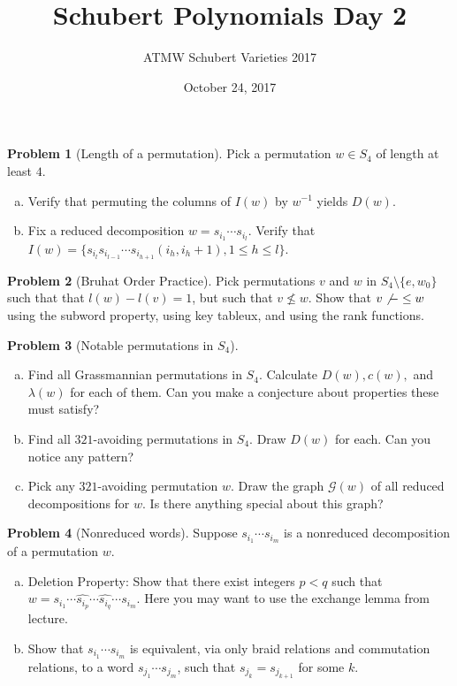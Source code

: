 \documentclass{amsart}
\newcommand{\+}[1]{\ensuremath{\mathbf{#1}}}
\theoremstyle{definition}
\newtheorem{prob}{Problem}
\begin{document}
\title{Schubert Polynomials Day 2}
\date{October 24, 2017}
\author{ATMW Schubert Varieties 2017}

\maketitle

\begin{prob}[Length of a permutation]
Pick a permutation $w \in S_4$ of length at least $4$.
 \begin{enumerate}[(a)]
  \item Verify that permuting the columns of $I(w)$ by $w^{-1}$ yields $D(w)$.
  \item Fix a reduced decomposition $w = s_{i_1} \cdots s_{i_l}$.  Verify that
  $I(w) = \{s_{i_l}s_{i_{l-1}}\cdots s_{i_{h+1}}(i_h,i_h +1), 1 \leq h \leq l\}$.
 \end{enumerate}
\end{prob}


\begin{prob}[Bruhat Order Practice]
Pick permutations $v$ and $w$ in $S_4 \setminus \{e, w_0\}$ such that
that $l(w) - l(v) =1$, but such that $v \not\leq w$.
Show that $v \not-\leq w$ using the subword property, using key tableux, and using the rank functions.
\end{prob}

\begin{prob}[Notable permutations in $S_4$]
\begin{enumerate}[(a)]
 \item Find all Grassmannian permutations in $S_4$.  Calculate $D(w), c(w),$ and $\lambda(w)$ for each of them.
 Can you make a conjecture about properties these must satisfy?
 \item Find all $321$-avoiding permutations in $S_4$.  Draw $D(w)$ for each.  Can you notice any pattern?
 \item Pick any $321$-avoiding permutation $w$.  Draw the graph $\mathcal{G}(w)$ of all reduced decompositions for $w$.  Is
 there anything special about this graph?
\end{enumerate}
\end{prob}


\begin{prob}[Nonreduced words]
Suppose $s_{i_1} \cdots s_{i_m}$ is a nonreduced decomposition of a permutation $w$.
\begin{enumerate}[(a)]
\item Deletion Property:
 Show that there exist integers $p < q$ such that
 $w = s_{i_1} \cdots \hat{s_{i_p}} \cdots \hat{s_{i_q}} \cdots s_{i_m}$.
 Here you may want to use the exchange lemma from lecture.
 \item Show that $s_{i_1} \cdots s_{i_m}$ is equivalent, via only braid relations and commutation relations,
 to a word $s_{j_1} \cdots s_{j_m}$, such that $s_{j_k} = s_{j_{k+1}}$ for some $k$. 
\end{enumerate}
\end{prob}
\end{document}
